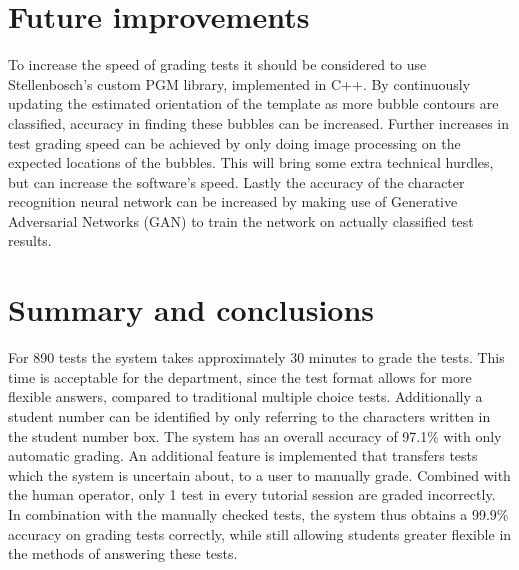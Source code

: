 \section{Future improvements}
To increase the speed of grading tests it should be considered to use Stellenbosch's custom PGM library, implemented in C++. By continuously updating the estimated orientation of the template as more bubble contours are classified, accuracy in finding these bubbles can be increased. Further increases in test grading speed can be achieved by only doing image processing on the expected locations of the bubbles. This will bring some extra technical hurdles, but can increase the software's speed. Lastly the accuracy of the character recognition neural network can be increased by making use of Generative Adversarial Networks (GAN) to train the network on actually classified test results.

\section{Summary and conclusions}
For 890 tests the system takes approximately 30 minutes to grade the tests. This time is acceptable for the department, since the test format allows for more flexible answers, compared to traditional multiple choice tests. Additionally a student number can be identified by only referring to the characters written in the student number box. The system has an overall accuracy of 97.1\% with only automatic grading. An additional feature is implemented that transfers tests which the system is uncertain about, to a user to manually grade. Combined with the human operator, only 1 test in every tutorial session are graded incorrectly. In combination with the manually checked tests, the system thus obtains a 99.9\% accuracy on grading tests correctly, while still allowing students greater flexible in the methods of answering these tests.